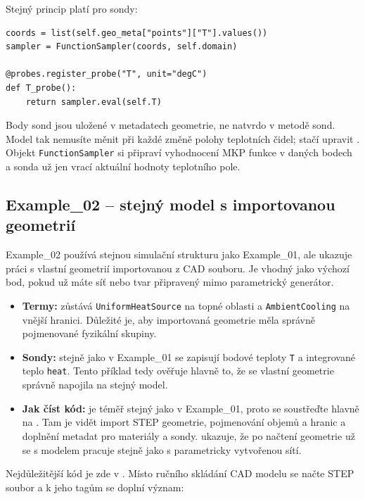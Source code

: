 \documentclass[a4paper,11pt]{article}
\begin{document}
Stejný princip platí pro sondy:

\begin{lstlisting}[style=py]
coords = list(self.geo_meta["points"]["T"].values())
sampler = FunctionSampler(coords, self.domain)

@probes.register_probe("T", unit="degC")
def T_probe():
    return sampler.eval(self.T)
\end{lstlisting}

Body sond jsou uložené v metadatech geometrie, ne natvrdo v metodě sond. Model
tak nemusíte měnit při každé změně polohy teplotních čidel; stačí upravit
. Objekt \texttt{FunctionSampler} si připraví vyhodnocení
MKP funkce v daných bodech a sonda už jen vrací aktuální hodnoty teplotního pole.

\subsection*{Example\_02 -- stejný model s importovanou geometrií}

Example\_02 používá stejnou simulační strukturu jako Example\_01, ale ukazuje
práci s vlastní geometrií importovanou z CAD souboru. Je vhodný jako výchozí bod,
pokud už máte síť nebo tvar připravený mimo parametrický generátor.

\begin{itemize}
  \item \textbf{Termy:} zůstává \texttt{UniformHeatSource} na topné oblasti a
        \texttt{AmbientCooling} na vnější hranici. Důležité je, aby importovaná
        geometrie měla správně pojmenované fyzikální skupiny.
  \item \textbf{Sondy:} stejně jako v Example\_01 se zapisují bodové teploty
        \texttt{T} a integrované teplo \texttt{heat}. Tento příklad tedy ověřuje
        hlavně to, že se vlastní geometrie správně napojila na stejný model.
  \item \textbf{Jak číst kód:}  je téměř stejný jako v
        Example\_01, proto se soustřeďte hlavně na . Tam je
        vidět import STEP geometrie, pojmenování objemů a hranic a doplnění
        metadat pro materiály a sondy.  ukazuje, že po
        načtení geometrie už se s modelem pracuje stejně jako s parametricky
        vytvořenou sítí.
\end{itemize}

Nejdůležitější kód je zde v . Místo ručního skládání CAD
modelu se načte STEP soubor a k jeho tagům se doplní význam:
\end{document}
